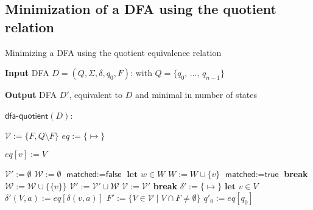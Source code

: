 \documentclass[11pt]{article}
\newcommand{\emptymap}{\ensuremath{\{ \mapsto \}}}
\newcommand{\var}[1]{\ensuremath{\textit{#1}}} %
\newcommand{\set}[1]{\ensuremath{\{ #1 \} }} %
\begin{document}

\clearpage
\subsection{Minimization of a DFA using the quotient relation}

\begin{algorithm}
\small
\caption{Minimizing a DFA using the quotient equivalence relation}
\vspace*{1.0ex}
\textbf{Input}
DFA $D = (Q, \Sigma, \delta, q_0, F)$: 
with $Q = \lbrace q_0 ,\, \ldots ,\, q_{n{-}1} \rbrace$

\textbf{Output} 
DFA $D'$, equivalent to $D$ and minimal in number of states

\vspace{2.0ex}

$\textsf{dfa-quotient}(D)$:
\begin{algorithmic}[1]
\State $\mathcal{V} := \set{F, Q \setminus F }$ 
  \State $\var{eq} := \emptymap$ 

      \State $\var{eq}[v] := V$
    \EndFor  
  \EndFor

  \State $\mathcal{V}' := \emptyset$ 
    \State $\mathcal{W} := \emptyset$ 
      \State $\textsf{matched} := \textsf{false}$
        \State $\textbf{let } w \in W$
        \If { $\forall a \in \Sigma: \var{eq}[\delta(v,a)] = \var{eq}[\delta(w,a)]$ }
          \State $W := W \cup \set{v}$
          \State $\textsf{matched} := \textsf{true}$
          \State \textbf{break}
        \EndIf
      \EndFor
        \State $\mathcal{W} := \mathcal{W} \cup \set{ \set{v} }$ 
      \EndIf
    \EndFor
    \State $\mathcal{V}' := \mathcal{V}' \cup \mathcal{W}$
  \EndFor
    \State $\mathcal{V} := \mathcal{V}'$
  \Else
    \State \textbf{break}
  \EndIf
\EndWhile
\State $\delta' := \emptymap$
  \State $\textbf{let } v \in V$
    \State $\delta'(V,a) := \var{eq}[\delta(v,a)] $
  \EndFor
\EndFor
\State $F' := \set{ V \in \mathcal{V} \mid V \cap F \neq \emptyset }$
\State $q'_0 := \var{eq}[q_0]$
\State {}
\vspace*{1.0ex}
\end{algorithmic}
\end{algorithm}
\end{document}
